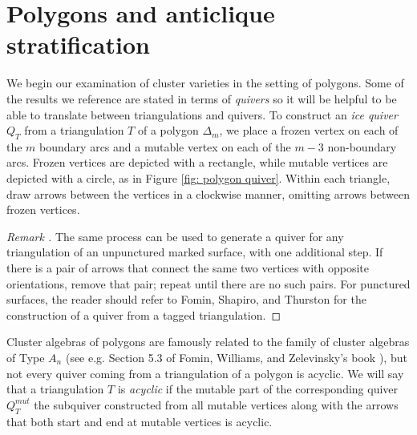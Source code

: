 \documentclass[reqno,12pt]{amsart}
\theoremstyle{definition}
\theoremstyle{remark}
\theoremstyle{remark}
\newenvironment{rem}{\refstepcounter{thm}\begin{proof}[Remark \emph{\thethm}]\renewcommand*{\qedsymbol}{\(\blacksquare\)}}{\end{proof}}
\numberwithin{equation}{section}
\begin{document}
\section{Polygons and anticlique stratification}\label{section: anticlique}

We begin our examination of cluster varieties in the setting of polygons. Some of the results we reference are stated in terms of \emph{quivers} so it will be helpful to be able to translate between triangulations and quivers. 
To construct an \emph{ice quiver} $Q_T$ from a triangulation $T$ of a polygon $\Delta_m$, we place a frozen vertex on each of the $m$ boundary arcs and a mutable vertex on each of the $m-3$ non-boundary arcs. Frozen vertices are depicted with a rectangle, while mutable vertices are depicted with a circle, as in Figure \ref{fig: polygon quiver}. Within each triangle, draw arrows between the vertices in a clockwise manner, omitting arrows between frozen vertices. 

\begin{rem}
	The same process can be used to generate a quiver for any triangulation of an unpunctured marked surface, with one additional step. If there is a pair of arrows that connect the same two vertices with opposite orientations, remove that pair; repeat until there are no such pairs. For punctured surfaces, the reader should refer to Fomin, Shapiro, and Thurston \cite{FST08} for the construction of a quiver from a tagged triangulation.
\end{rem}

Cluster algebras of polygons are famously related to the family of cluster algebras of Type $A_n$ (see e.g. Section 5.3 of Fomin, Williams, and Zelevinsky's book \cite{FWZChapters45}), but not every quiver coming from a triangulation of a polygon is acyclic. We will say that a triangulation $T$ is \emph{acyclic} if the mutable part of the corresponding quiver $Q_T^{mut}$ \textemdash the subquiver constructed from all mutable vertices along with the arrows that both start and end at mutable vertices \textemdash is acyclic.
\end{document}
